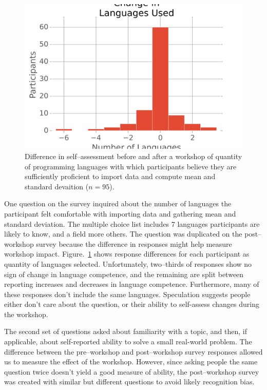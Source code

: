 \documentclass[10pt, twocolumn]{article}
\begin{document}
	\begin{figure}
    	\centering
    	\includegraphics[width=\linewidth]{figures/ProgrammingLanguages}
    	\caption{
            Difference in self--assessment before and after a workshop
            of quantity of programming languages
            with which participants believe they are sufficiently proficient
            to import data and compute mean and standard devaition ($n=95$).
    	}
    	\label{ProgrammingLanguages}
	\end{figure}
	
	One question on the survey inquired about the number of languages the participant felt comfortable with 
	importing data and gathering mean and standard deviation.
	The multiple choice list includes 7 languages 
	participants are likely to know,
	and a field more others.
	The question was duplicated on the post--workshop survey
	because the difference in responses might help measure workshop impact.
	Figure.~\ref{ProgrammingLanguages} shows response differences
	for each participant as quantity of languages selected.
	Unfortunately, two--thirds of responses show no sign of change in language competence,
	and the remaining are split between reporting 
	increases and decreases in language competence.
	Furthermore, many of these responses don't include the same languages.
	Speculation suggests people either don't care about the question,
	or their ability to self-assess changes during the workshop.
	
	The second set of questions asked about familiarity with a topic,
	and then,
	if applicable,
	about self-reported ability to solve a small real-world problem.
	The difference between the pre--workshop and post--workshop survey responses allowed us to measure the effect of the workshop.
	However, since asking people the same question twice doesn't yield a good measure of ability,
	the post--workshop survey was created with similar but different questions
    to avoid likely recognition bias.
\end{document}
